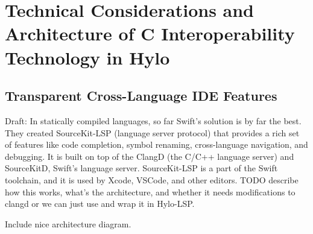 \section{Technical Considerations and Architecture of C Interoperability Technology in Hylo}

















\subsection{Transparent Cross-Language IDE Features}
Draft: In statically compiled languages, so far Swift's solution is by far the best. They created SourceKit-LSP (language server protocol) that provides a rich set of features like code completion, symbol renaming, cross-language navigation, and debugging. It is built on top of the ClangD (the C/C++ language server) and SourceKitD, Swift's language server. SourceKit-LSP is a part of the Swift toolchain, and it is used by Xcode, VSCode, and other editors. TODO describe how this works, what's the architecture, and whether it needs modifications to clangd or we can just use and wrap it in Hylo-LSP.

Include nice architecture diagram.





































